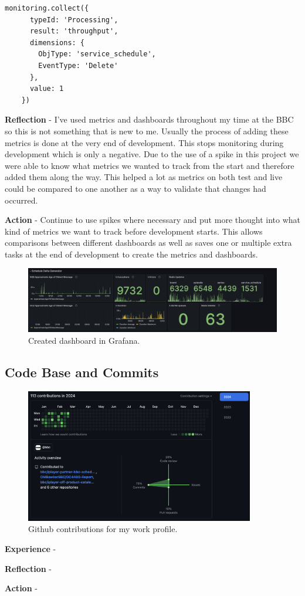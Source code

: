    \begin{lstlisting}[caption=Code used to update a metric\, this variation tracks a schedule delete.]
    monitoring.collect({
      typeId: 'Processing',
      result: 'throughput',
      dimensions: {
        ObjType: 'service_schedule',
        EventType: 'Delete'
      },
      value: 1
    })
  \end{lstlisting}

  \textbf{Reflection} - I've used metrics and dashboards throughout my time at the BBC so this is not something that is new to me. Usually the process of 
  adding these metrics is done at the very end of development. This stops monitoring during development which is only a negative. Due to the use of a spike 
  in this project we were able to know what metrics we wanted to track from the start and therefore added them along the way. This helped a lot as metrics on 
  both test and live could be compared to one another as a way to validate that changes had occurred.
  
  \vspace{0.2cm}
  \textbf{Action} - Continue to use spikes where necessary and put more thought into what kind of metrics we want to track before development starts.
  This allows comparisons between different dashboards as well as saves one or multiple extra tasks at the end of development to create the metrics and
  dashboards.

  \begin{figure}[H]
    \centering
    \includegraphics[width=12cm]{assets/outputs/dashboard.png}
    \caption{Created dashboard in Grafana.}
    \label{fig:dashboard}
  \end{figure}
  
  \newpage
  \subsection{Code Base and Commits}

  \begin{figure}[H]
    \centering
    \includegraphics[width=10cm]{assets/outputs/githubContributions.png}
    \caption{Github contributions for my work profile.}
    \label{fig:githubContributions}
  \end{figure}

  \textbf{Experience} -

  \textbf{Reflection} -

  \textbf{Action} -

\newpage
